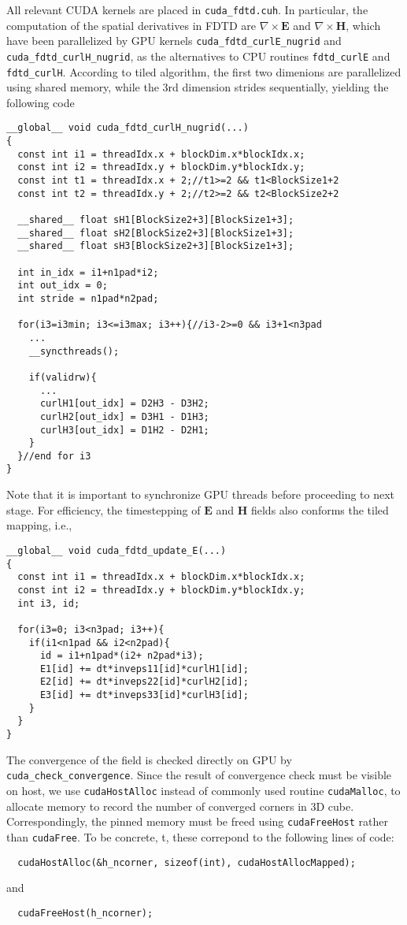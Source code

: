 \documentclass[a4paper,10pt]{article}
\begin{document}
All relevant CUDA kernels are placed in \verb|cuda_fdtd.cuh|. In particular, the computation of the spatial derivatives in FDTD are $\nabla\times \mathbf{E}$ and $\nabla\times\mathbf{H}$, which have been parallelized by GPU kernels \verb|cuda_fdtd_curlE_nugrid| and \verb|cuda_fdtd_curlH_nugrid|, as the alternatives to CPU routines \verb|fdtd_curlE| and \verb|fdtd_curlH|. According to tiled algorithm, the first two dimenions are parallelized using shared memory, while the 3rd dimension strides sequentially, yielding the following code
\begin{verbatim}
__global__ void cuda_fdtd_curlH_nugrid(...)		
{
  const int i1 = threadIdx.x + blockDim.x*blockIdx.x;
  const int i2 = threadIdx.y + blockDim.y*blockIdx.y;
  const int t1 = threadIdx.x + 2;//t1>=2 && t1<BlockSize1+2
  const int t2 = threadIdx.y + 2;//t2>=2 && t2<BlockSize2+2

  __shared__ float sH1[BlockSize2+3][BlockSize1+3];
  __shared__ float sH2[BlockSize2+3][BlockSize1+3];
  __shared__ float sH3[BlockSize2+3][BlockSize1+3];

  int in_idx = i1+n1pad*i2;
  int out_idx = 0;
  int stride = n1pad*n2pad;

  for(i3=i3min; i3<=i3max; i3++){//i3-2>=0 && i3+1<n3pad
    ...
    __syncthreads();

    if(validrw){
      ...
      curlH1[out_idx] = D2H3 - D3H2;
      curlH2[out_idx] = D3H1 - D1H3;
      curlH3[out_idx] = D1H2 - D2H1;
    }
  }//end for i3
}
\end{verbatim}
Note that it is important to synchronize GPU threads before proceeding to next stage. For efficiency, the timestepping of $\mathbf{E}$ and $\mathbf{H}$ fields also conforms the tiled mapping, i.e.,
\begin{verbatim}
__global__ void cuda_fdtd_update_E(...)
{
  const int i1 = threadIdx.x + blockDim.x*blockIdx.x;
  const int i2 = threadIdx.y + blockDim.y*blockIdx.y;
  int i3, id;
  
  for(i3=0; i3<n3pad; i3++){
    if(i1<n1pad && i2<n2pad){
      id = i1+n1pad*(i2+ n2pad*i3);
      E1[id] += dt*inveps11[id]*curlH1[id];
      E2[id] += dt*inveps22[id]*curlH2[id];
      E3[id] += dt*inveps33[id]*curlH3[id];
    }
  }
}
\end{verbatim}
The convergence of the field is checked directly on GPU by \verb|cuda_check_convergence|. Since the result of convergence check must be visible on host, we use \verb|cudaHostAlloc| instead of commonly used routine \verb|cudaMalloc|, to allocate memory to record the number of converged corners in 3D cube. Correspondingly, the pinned memory must be freed using \verb|cudaFreeHost| rather than \verb|cudaFree|. To be concrete, t, these correpond to the following lines of code:
\begin{verbatim}
  cudaHostAlloc(&h_ncorner, sizeof(int), cudaHostAllocMapped);
\end{verbatim}
and
\begin{verbatim}
  cudaFreeHost(h_ncorner);
\end{verbatim}
\end{document}
